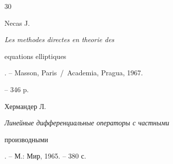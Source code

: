 \begin{thebibliography}{30}


Necas J. {\em Les methodes directes en theorie des


equations elliptiques}. -- Masson, Paris~/~Academia, Pragua, 1967.


-- 346 p.







Хермандер Л. {\em Линейные дифференциальные операторы с частными 


производными}. -- М.: Мир, 1965. -- 380 с.





\end{thebibliography}





\vskip 2cm












\label{end}





